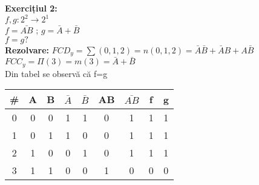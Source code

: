 \documentclass[12pt]{article}
\begin{document}
\begin{figure}[h!]
    \begin{minipage}{0.6\textwidth}
        \textbf{Exercițiul 2:\\}
        $f,g:2^2\rightarrow2^1$\\
        $f=\bar{AB}$ ; $g=\bar{A}+\bar{B}$\\
        $f=g?$\\
        \textbf{Rezolvare:}
        $FCD_{y}=\sum(0,1,2)=n(0,1,2)=\bar{A}\bar{B}+\bar{A}B+A\bar{B}$\\
        $FCC_{y}=\Pi(3)=m(3)=\bar{A}+\bar{B}$\\
        Din tabel se observă că f=g\\
    \end{minipage}
    \hfill
    \begin{minipage}{0.4\textwidth}
        \begin{tabular}{|c|c|c|c|c|c|c|c|c|}
            \hline
            \# & A & B & $\bar{A}$ & $\bar{B}$ & AB & $\bar{AB}$ & f & g \\ \hline
            0 & 0 & 0 & 1 & 1 & 0 & 1 & 1 & 1\\ \hline
            1 & 0 & 1 & 1 & 0 & 0 & 1 & 1 & 1\\ \hline
            2 & 1 & 0 & 0 & 1 & 0 & 1 & 1 & 1\\ \hline
            3 & 1 & 1 & 0 & 0 & 1 & 0 & 0 & 0\\ \hline
        \end{tabular}
    \end{minipage}
\end{figure}
\end{document}
